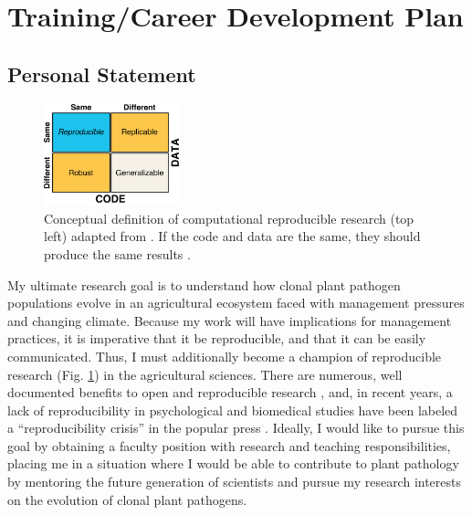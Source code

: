 \documentclass[12pt,letterpaper]{article}
\title{\ruleline{Project Narrative}}
\begin{document}
\maketitle

\section{Training/Career Development Plan}


\subsection{Personal Statement}

\begin{figure}
  \includegraphics[width=0.35\textwidth]{figure/whitaker2017publishing.pdf}
  \caption{
  Conceptual definition of computational reproducible research (top left) adapted from \citet{whitaker2017publishing}. If the code and data are the same, they should produce the same results \citep{patil2016statistical}.
  }
  \label{fig:rr-def}
\end{figure}


My ultimate research goal is to understand how clonal plant pathogen populations evolve in an agricultural ecosystem faced with management pressures and changing climate.
Because my work will have implications for management practices, it is imperative that it be reproducible, and that it can be easily communicated.  
Thus, I must additionally become a champion of reproducible research (Fig. \ref{fig:rr-def}) in the agricultural sciences. 
There are numerous, well documented benefits to open and reproducible research \citep{mckiernan2016open}, and, in recent years, a lack of reproducibility in psychological and biomedical studies have been labeled a ``reproducibility crisis'' in the popular press \citep{baker2016scientists,patil2016statistical}.
Ideally, I would like to pursue this goal by obtaining a faculty position with
research and teaching responsibilities, placing me in a situation where I would be able to contribute to plant pathology by mentoring the future generation of scientists and pursue my research interests on the evolution of clonal plant pathogens.
\end{document}
